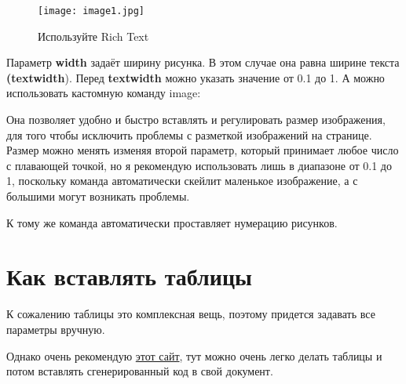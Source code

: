 \begin{figure}[!htb]
	\centering
	\texttt{[image: image1.jpg]}
	\caption{Используйте Rich Text}
	\label{fig:image1}
\end{figure}

Параметр \textbf{width} задаёт ширину рисунка. В этом случае она равна ширине текста \textbf{(textwidth}). Перед\textbf{ textwidth} можно указать значение от 0.1 до 1.
А можно использовать кастомную команду image:


Она позволяет удобно и быстро вставлять и регулировать размер изображения, для того чтобы исключить проблемы с разметкой изображений на странице. Размер можно менять изменяя второй параметр, который принимает любое число с плавающей точкой, но я рекомендую использовать лишь в диапазоне от 0.1 до 1, поскольку команда автоматически скейлит маленькое изображение, а с большими могут возникать проблемы.


К тому же команда автоматически проставляет нумерацию рисунков.
\section{Как вставлять таблицы}
К сожалению таблицы это комплексная вещь, поэтому придется задавать все параметры вручную.

Однако очень рекомендую \href{https://truben.no/table/}{этот сайт}, тут можно очень легко делать таблицы и потом вставлять сгенерированный код в свой документ.
\newpage




